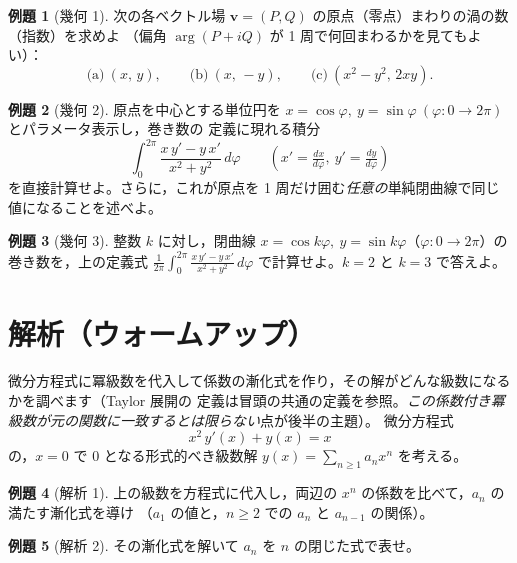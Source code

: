 \documentclass[dvipdfmx, uplatex]{jsarticle}
\theoremstyle{definition}
\newtheorem*{ex}{例題}
\begin{document}
\begin{ex}[幾何 1]
次の各ベクトル場 $\bm v=(P,Q)$ の原点（零点）まわりの渦の数（指数）を求めよ
（偏角 $\arg(P+iQ)$ が 1 周で何回まわるかを見てもよい）：
\[
    \text{(a)}\ (x,\,y),\qquad \text{(b)}\ (x,\,-y),\qquad \text{(c)}\ (x^2-y^2,\,2xy).
\]
\end{ex}

\begin{ex}[幾何 2]
原点を中心とする単位円を $x=\cos\varphi,\ y=\sin\varphi\ (\varphi:0\to2\pi)$ とパラメータ表示し，巻き数の
定義に現れる積分
\[
    \int_0^{2\pi}\frac{x\,y'-y\,x'}{x^2+y^2}\,d\varphi\qquad(x'=\tfrac{dx}{d\varphi},\ y'=\tfrac{dy}{d\varphi})
\]
を直接計算せよ。さらに，これが原点を 1 周だけ囲む\emph{任意の}単純閉曲線で同じ値になることを述べよ。
\end{ex}

\begin{ex}[幾何 3]
整数 $k$ に対し，閉曲線 $x=\cos k\varphi,\ y=\sin k\varphi$（$\varphi:0\to2\pi$）の巻き数を，上の定義式
$\tfrac{1}{2\pi}\int_0^{2\pi}\tfrac{x\,y'-y\,x'}{x^2+y^2}\,d\varphi$ で計算せよ。$k=2$ と $k=3$ で答えよ。
\end{ex}

\section{解析（ウォームアップ）}
微分方程式に冪級数を代入して係数の漸化式を作り，その解がどんな級数になるかを調べます（Taylor 展開の
定義は冒頭の共通の定義を参照。\emph{この係数付き冪級数が元の関数に一致するとは限らない}点が後半の主題）。
微分方程式
\[
    x^2\,y'(x) + y(x) = x
\]
の，$x=0$ で $0$ となる形式的べき級数解 $y(x)=\displaystyle\sum_{n\ge1} a_n x^n$ を考える。

\begin{ex}[解析 1]
上の級数を方程式に代入し，両辺の $x^n$ の係数を比べて，$a_n$ の満たす漸化式を導け
（$a_1$ の値と，$n\ge2$ での $a_n$ と $a_{n-1}$ の関係）。
\end{ex}

\begin{ex}[解析 2]
その漸化式を解いて $a_n$ を $n$ の閉じた式で表せ。
\end{ex}
\end{document}

